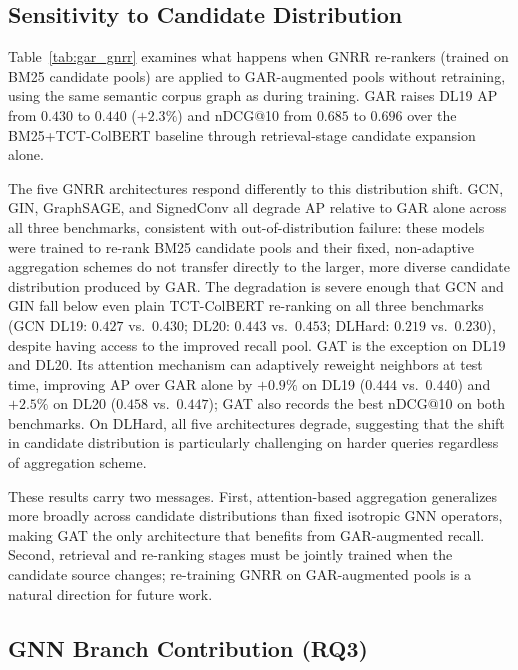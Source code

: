 \documentclass[runningheads]{llncs}
\newcommand{\ModelName}{GNRR\xspace}
\begin{document}
\subsection{Sensitivity to Candidate Distribution}\label{sec:gar}

Table~\ref{tab:gar_gnrr} examines what happens when \ModelName re-rankers (trained on BM25 candidate pools) are applied to GAR-augmented pools without retraining, using the same semantic corpus graph as during training.
GAR raises DL19 AP from $0.430$ to $0.440$ ($+2.3\%$) and nDCG@10 from $0.685$ to $0.696$ over the BM25+TCT-ColBERT baseline through retrieval-stage candidate expansion alone.

The five \ModelName architectures respond differently to this distribution shift.
GCN, GIN, GraphSAGE, and SignedConv all degrade AP relative to GAR alone across all three benchmarks, consistent with out-of-distribution failure: these models were trained to re-rank BM25 candidate pools and their fixed, non-adaptive aggregation schemes do not transfer directly to the larger, more diverse candidate distribution produced by GAR.
The degradation is severe enough that GCN and GIN fall below even plain TCT-ColBERT re-ranking on all three benchmarks (GCN DL19: $0.427$ vs.\ $0.430$; DL20: $0.443$ vs.\ $0.453$; DLHard: $0.219$ vs.\ $0.230$), despite having access to the improved recall pool.
GAT is the exception on DL19 and DL20. Its attention mechanism can adaptively reweight neighbors at test time, improving AP over GAR alone by $+0.9\%$ on DL19 ($0.444$ vs.\ $0.440$) and $+2.5\%$ on DL20 ($0.458$ vs.\ $0.447$); GAT also records the best nDCG@10 on both benchmarks. On DLHard, all five architectures degrade, suggesting that the shift in candidate distribution is particularly challenging on harder queries regardless of aggregation scheme.

These results carry two messages. First, attention-based aggregation generalizes more broadly across candidate distributions than fixed isotropic GNN operators, making GAT the only architecture that benefits from GAR-augmented recall. Second, retrieval and re-ranking stages must be jointly trained when the candidate source changes; re-training \ModelName on GAR-augmented pools is a natural direction for future work.

\subsection{GNN Branch Contribution (RQ3)}
\end{document}
